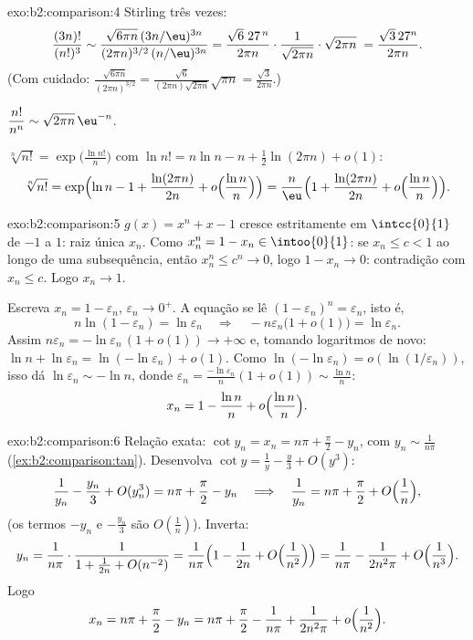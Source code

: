 \begin{solution}{exo:b2:comparison:4}
Stirling três vezes:
\[
\frac{(3n)!}{(n!)^3}
\sim \frac{\sqrt{6\pi n}\,(3n/\eu)^{3n}}
{(2\pi n)^{3/2}\,(n/\eu)^{3n}}
= \frac{\sqrt{6}\; 27^{\,n}}{2\pi n} \cdot
\frac{1}{\sqrt{2\pi n}}\cdot\sqrt{2\pi n}\;
= \frac{\sqrt3\,27^n}{2\pi n} .
\]
(Com cuidado: $\frac{\sqrt{6\pi n}}{(2\pi n)^{3/2}} =
\frac{\sqrt6}{(2\pi n)\sqrt{2\pi n}}\sqrt{\pi n} =
\frac{\sqrt3}{2\pi n}$.)

$\dfrac{n!}{n^n} \sim \sqrt{2\pi n}\,\eu^{-n}$.

$\sqrt[n]{n!} = \exp\bigl(\frac{\ln n!}{n}\bigr)$ com $\ln n! = n\ln
n - n + \frac12\ln(2\pi n) + o(1)$:
\[
\sqrt[n]{n!} = \exp\Bigl(\ln n - 1 + \frac{\ln(2\pi n)}{2n} +
o\Bigl(\frac{\ln n}{n}\Bigr)\Bigr)
= \frac{n}{\eu}\Bigl(1 + \frac{\ln(2\pi n)}{2n} +
o\Bigl(\frac{\ln n}{n}\Bigr)\Bigr).
\]
\end{solution}

\begin{solution}{exo:b2:comparison:5}
$g(x) = x^n + x - 1$ cresce estritamente em $\intcc{0}{1}$ de $-1$
a $1$: raiz única $x_n$. Como $x_n^n = 1 - x_n \in
\intoo{0}{1}$: se $x_n \leq c < 1$ ao longo de uma subsequência, então $x_n^n
\leq c^n \to 0$, logo $1 - x_n \to 0$: contradição com $x_n \leq
c$. Logo $x_n \to 1$.

Escreva $x_n = 1 - \varepsilon_n$, $\varepsilon_n \to 0^+$. A
equação se lê $(1 - \varepsilon_n)^n = \varepsilon_n$, isto é,
\[
n\ln(1 - \varepsilon_n) = \ln \varepsilon_n
\quad\Longrightarrow\quad
-n\varepsilon_n\bigl(1 + o(1)\bigr) = \ln\varepsilon_n .
\]
Assim $n\varepsilon_n = -\ln\varepsilon_n\,(1 + o(1)) \to +\infty$ e,
tomando logaritmos de novo: $\ln n + \ln\varepsilon_n =
\ln(-\ln\varepsilon_n) + o(1)$. Como $\ln(-\ln \varepsilon_n) =
o(\ln(1/\varepsilon_n))$, isso dá $\ln\varepsilon_n \sim -\ln
n$, donde $\varepsilon_n = \frac{-\ln\varepsilon_n}{n}(1 + o(1))
\sim \frac{\ln n}{n}$:
\[
x_n = 1 - \frac{\ln n}{n} + o\Bigl(\frac{\ln n}{n}\Bigr) .
\]
\end{solution}

\begin{solution}{exo:b2:comparison:6}
Relação exata: $\cot y_n = x_n = n\pi + \frac\pi2 - y_n$, com $y_n
\sim \frac{1}{n\pi}$ (\cref{ex:b2:comparison:tan}). Desenvolva $\cot y
= \frac1y - \frac y3 + O(y^3)$:
\[
\frac{1}{y_n} - \frac{y_n}{3} + O(y_n^3) = n\pi + \frac\pi2 - y_n
\quad\Longrightarrow\quad
\frac{1}{y_n} = n\pi + \frac\pi2 + O\Bigl(\frac1n\Bigr),
\]
(os termos $-y_n$ e $-\frac{y_n}{3}$ são $O(\frac1n)$). Inverta:
\[
y_n = \frac{1}{n\pi}\cdot\frac{1}{1 + \frac{1}{2n} + O(n^{-2})}
= \frac{1}{n\pi}\Bigl(1 - \frac{1}{2n} + O\Bigl(\frac{1}{n^2}\Bigr)\Bigr)
= \frac{1}{n\pi} - \frac{1}{2n^2\pi} + O\Bigl(\frac{1}{n^3}\Bigr).
\]
Logo
\[
x_n = n\pi + \frac{\pi}{2} - y_n
= n\pi + \frac\pi2 - \frac{1}{n\pi} + \frac{1}{2n^2\pi} +
o\Bigl(\frac{1}{n^2}\Bigr).
\]
\end{solution}

